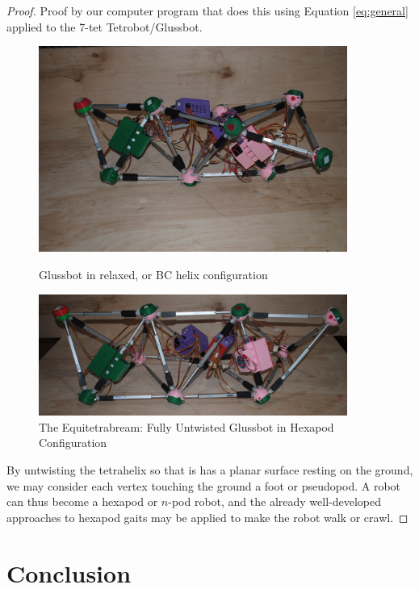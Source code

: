\documentclass[review]{siamonline1116}
\begin{document}
\begin{proof}
  Proof by our computer program that does this using Equation \eqref{eq:general} applied to the
  7-tet Tetrobot/Glussbot.

\begin{figure}[H] %
  \centering
     \includegraphics[width=0.9\textwidth]{figures/GlussBotBC.jpg}
     \caption{Glussbot in relaxed, or BC helix configuration}
     \includegraphics[width=0.9\textwidth]{figures/GlussBotEquitetrabeamCropped.jpg}
     \caption{The Equitetrabream: Fully Untwisted Glussbot in Hexapod Configuration}
     \label{fig:glussbot}
\end{figure}

By untwisting the tetrahelix so that is has a planar surface resting on the ground,
we may consider each vertex touching the ground a foot or pseudopod. A robot can thus
become a hexapod or $n$-pod robot, and the already well-developed approaches to
hexapod gaits may be applied to make the robot walk or crawl.

\end{proof}

\section{Conclusion}
\end{document}
